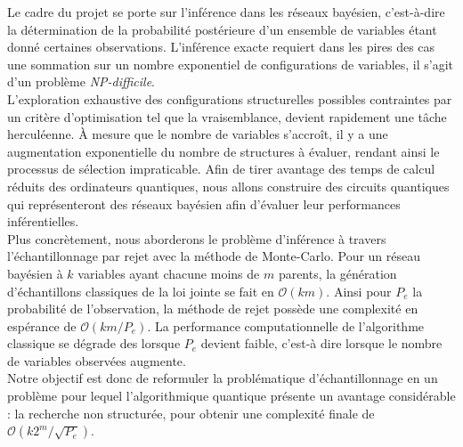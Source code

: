 Le cadre du projet se porte sur l'inférence dans les réseaux bayésien, c'est-à-dire la détermination de la probabilité postérieure d'un ensemble de variables étant donné certaines observations. L'inférence exacte requiert dans les pires des cas une sommation sur un nombre exponentiel de configurations de variables, il s'agit d'un problème \textit{NP-difficile}.\footnotemark
\\
L'exploration exhaustive des configurations structurelles possibles contraintes par un critère d'optimisation tel que la vraisemblance, devient rapidement une tâche herculéenne. À mesure que le nombre de variables s'accroît, il y a une augmentation exponentielle du nombre de structures à évaluer, rendant ainsi le processus de sélection impraticable. Afin de tirer avantage des temps de calcul réduits des ordinateurs quantiques, nous allons construire des circuits quantiques qui représenteront des réseaux bayésien afin d'évaluer leur performances inférentielles.
\\
Plus concrètement, nous aborderons le problème d'inférence à travers 
l'échantillonnage par rejet avec la méthode de Monte-Carlo. Pour un réseau 
bayésien à $k$ variables ayant chacune moins de $m$ parents, la génération d’échantillons classiques de la loi jointe se fait en $\mathcal{O}(km)$. Ainsi pour $P_e$ la probabilité de l’observation, la méthode de rejet possède une complexité en espérance de $\mathcal{O}(km/P_e)$. La performance computationnelle de l’algorithme classique se dégrade des lorsque $P_e$ devient faible, c'est-à dire lorsque le nombre de variables observées augmente.
\\
Notre objectif est donc de reformuler la problématique d'échantillonnage en un problème pour lequel l'algorithmique quantique présente un avantage considérable : la recherche non structurée, pour obtenir une complexité finale de $\mathcal{O}(k2^m/\sqrt{P_e})$. 


